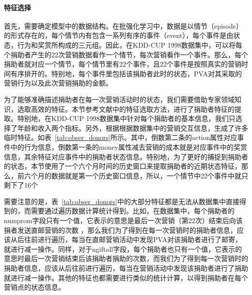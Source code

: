 \paragraph{特征选择}
首先，需要确定模型中的数据结构。在批强化学习中，数据是以情节（episode）的形式存在的，每个情节内有包含一系列有序的事件（event），每个事件是由状态，行为和奖赏所构成的三元组。因此，在KDD-CUP 1998数据集中，可以将每个捐助者产生的22次营销数据看作一个情节，每次营销看作一个事件。那么，每个捐助者就对应一个情节，每个情节里有22个事件，且22个事件是按照真实的营销时间有序排开的。特别地，每个事件里包括该捐助者此时的状态，PVA对其采取的营销行为以及此次营销捐助的金额。

为了能够准确描述捐助者在每一次营销活动时的状态，我们需要借助专家领域知识，选取高效的特征。本节参考文献\citep{pednault2002sequential}中的特征选取方法，进行了捐助者特征的提取。特别地，在KDD-CUP 1998数据集中针对每个捐助者的基本信息，我们只选择了年龄和收入两个指标。另外，根据根据数据集中的营销交互信息，生成了许多临时特征。如表~\ref{tab:obser_donors}所示。其中，倒数第二条的action属性对应事件中的行为信息，倒数第一条的money属性减去营销的成本就是对应事件中的奖赏信息，其余特征对应事件中的捐助者状态信息。特别地，为了更好的捕捉到捐助者的状态，本节使用了一个六个月时间的历史窗口来提取捐助者的近期状态特征，那么，前六个月的数据就是第一个历史窗口信息，所以，一个情节中22个事件中就只剩下了16个

需要注意的是，表~\ref{tab:obser_donors}中的大部分特征都是无法从数据集中直接得到的，而需要通过遍历数据计算统计得到。比如，在数据集中，每个捐助者的numprom字段只有一个值，它表示的意思是最后一次营销（第22次）结束后向该捐者发送直邮营销的次数 ，那么我们为了得到在每一次营销时的捐助者信息，应该从后往前进行遍历，每当在直邮营销活动中发现PVA对该捐助者进行了邮寄，就进行减一操作。同样，对于ngiftall字段，每个捐助者也只有一个值，它表示的意思时最后一次营销结束后该捐助者捐助的次数，而我们为了得到每一次营销时的捐助者信息，应该从后往前进行遍历，每当在营销活动中发现该捐助者进行了捐助就进行减一操作。其他的特征也都需要进行类似的统计计算，以得到捐助者在每个营销点的状态信息。


